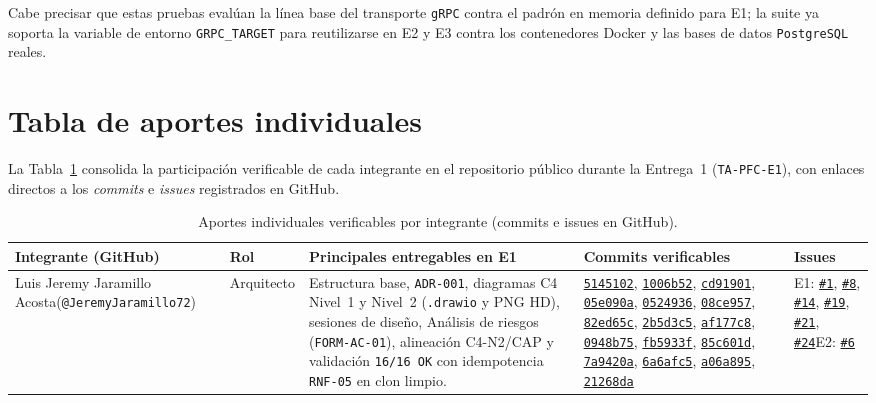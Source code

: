 \documentclass[11pt,a4paper]{article}
\begin{document}
Cabe precisar que estas pruebas evalúan la línea base del transporte \texttt{gRPC} contra el padrón en memoria definido para E1; la suite ya soporta la variable de entorno \texttt{GRPC\_TARGET} para reutilizarse en E2 y E3 contra los contenedores Docker y las bases de datos \texttt{PostgreSQL} reales.

\section{Tabla de aportes individuales}

La Tabla~\ref{tab:aportes} consolida la participación verificable de cada integrante en el repositorio público durante la Entrega~1 (\texttt{TA-PFC-E1}), con enlaces directos a los \textit{commits} e \textit{issues} registrados en GitHub.

\begin{table}[htbp]
\newcommand{\ghrepo}{https://github.com/JeremyJaramillo72/TA-PFC-E1-PFC-Entrega-1-Propuesta-y-An-lisis-del-Sistema-Distribuido}
\newcommand{\ghcommit}[1]{\href{\ghrepo/commit/#1}{\texttt{#1}}}
\newcommand{\ghissue}[1]{\href{\ghrepo/issues/#1}{\texttt{\##1}}}
\centering
\caption{Aportes individuales verificables por integrante (commits e issues en GitHub).}
\label{tab:aportes}
\footnotesize
\setlength{\tabcolsep}{4pt}
\begin{tabularx}{\textwidth}{>{\raggedright\arraybackslash}p{3.2cm} >{\raggedright\arraybackslash}p{2.0cm} >{\raggedright\arraybackslash}X >{\raggedright\arraybackslash}p{3.6cm} >{\raggedright\arraybackslash}p{2.1cm}}
\toprule
\textbf{Integrante (GitHub)} & \textbf{Rol} & \textbf{Principales entregables en E1} & \textbf{Commits verificables} & \textbf{Issues} \\
\midrule
Luis Jeremy Jaramillo Acosta\newline (\texttt{@JeremyJaramillo72}) & Arquitecto & Estructura base, \texttt{ADR-001}, diagramas C4 Nivel~1 y Nivel~2 (\texttt{.drawio} y PNG HD), sesiones de diseño, Análisis de riesgos (\texttt{FORM-AC-01}), alineación C4-N2/CAP y validación \texttt{16/16 OK} con idempotencia \texttt{RNF-05} en clon limpio. & \ghcommit{5145102}, \ghcommit{1006b52}, \ghcommit{cd91901}, \ghcommit{05e090a}, \ghcommit{0524936}, \ghcommit{08ce957}, \ghcommit{82ed65c}, \ghcommit{2b5d3c5}, \ghcommit{af177c8}, \ghcommit{0948b75}, \ghcommit{fb5933f}, \ghcommit{85c601d}, \ghcommit{7a9420a}, \ghcommit{6a6afc5}, \ghcommit{a06a895}, \ghcommit{21268da} & E1: \ghissue{1}, \ghissue{8}, \ghissue{14}, \ghissue{19}, \ghissue{21}, \ghissue{24}\newline E2: \ghissue{6} \\

\end{tabularx}
\end{table}
\end{document}
